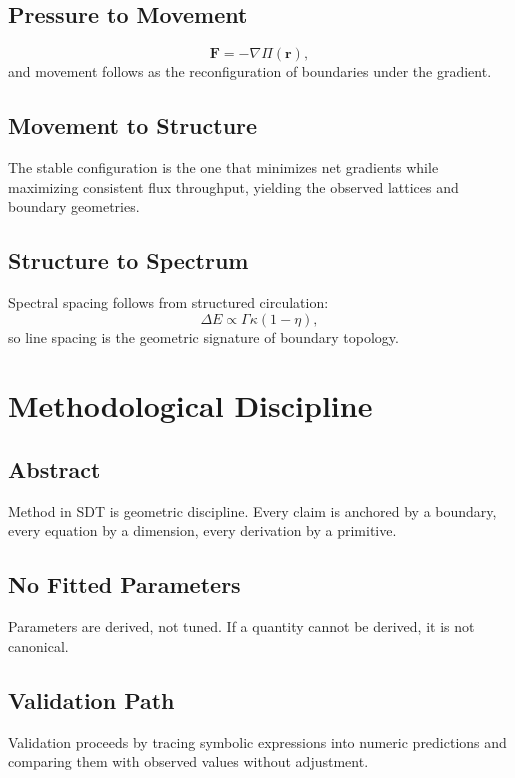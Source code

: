 \documentclass[12pt]{book}
\begin{document}
\section{Pressure to Movement}
\begin{equation}
\mathbf{F} = -\nabla \Pi(\mathbf{r}),
\end{equation}
and movement follows as the reconfiguration of boundaries under the gradient.

\section{Movement to Structure}
The stable configuration is the one that minimizes net gradients while maximizing consistent flux
throughput, yielding the observed lattices and boundary geometries.

\section{Structure to Spectrum}
Spectral spacing follows from structured circulation:
\begin{equation}
\Delta E \propto \Gamma \kappa (1-\eta),
\end{equation}
so line spacing is the geometric signature of boundary topology.

\chapter{Methodological Discipline}

\section*{Abstract}
Method in SDT is geometric discipline. Every claim is anchored by a boundary, every equation by a
dimension, every derivation by a primitive.

\section{No Fitted Parameters}
Parameters are derived, not tuned. If a quantity cannot be derived, it is not canonical.

\section{Validation Path}
Validation proceeds by tracing symbolic expressions into numeric predictions and comparing them with
observed values without adjustment.
\end{document}
